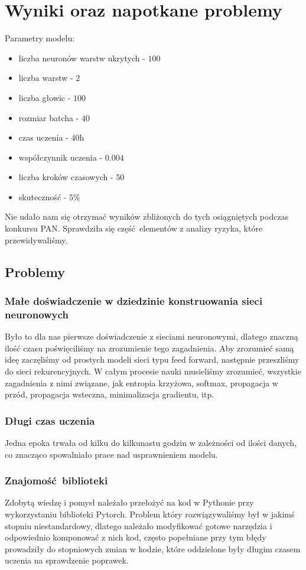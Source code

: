 \newpage
\section{Wyniki oraz napotkane problemy}

Parametry modelu:
\begin{itemize}
	  \item liczba neuronów warstw ukrytych - $100$
	  \item liczba warstw - $2$
	  \item liczba głowic - $100$
	  \item rozmiar batcha - $40$
	  \item czas uczenia - $40$h
	  \item współczynnik uczenia - $0.004$
	  \item liczba kroków czasowych - $50$
	  \item skuteczność - $5\%$ 
	\end{itemize}
	
Nie udało nam się otrzymać wyników zbliżonych do tych osiągniętych podczas konkursu PAN. Sprawdziła się
część elementów z analizy ryzyka, które przewidywaliśmy.

\subsection{Problemy}
\subsubsection{Małe doświadczenie w dziedzinie konstruowania sieci neuronowych}
Było to dla nas pierwsze doświadczenie z sieciami neuronowymi, dlatego znaczną ilość czasu poświęciliśmy na 
zrozumienie tego zagadnienia. Aby zrozumieć samą ideę zaczęliśmy od prostych modeli sieci typu feed forward,
następnie przeszliśmy do sieci rekurencyjnych. W całym procesie nauki musieliśmy zrozumieć,
wszystkie zagadnienia z nimi związane, jak entropia krzyżowa, softmax, propagacja w przód, propagacja wsteczna, 
minimalizacja gradientu, itp.
 
\subsubsection{Długi czas uczenia}
Jedna epoka trwała od kilku do kilkunastu godzin w zależności od ilości danych, co znacząco spowalniało 
prace nad usprawnieniem modelu. 
 
\subsubsection{Znajomość biblioteki}
Zdobytą wiedzę i pomysł należało przełożyć na kod w Pythonie przy wykorzystaniu biblioteki Pytorch. 
Problem który rozwiązywaliśmy był w jakimś stopniu niestandardowy, dlatego należało modyfikować 
gotowe narzędzia i odpowiednio komponować z nich kod, często popełniane przy tym błędy prowadziły 
do stopniowych zmian w kodzie, które oddzielone były długim czasem uczenia na sprawdzenie poprawek.

